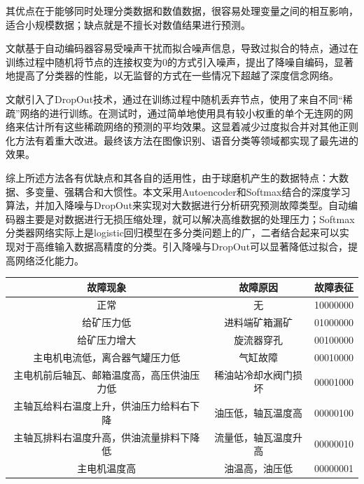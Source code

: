 \documentclass{ctacn}%
\begin{document}
\begin{multicols}{2}
其优点在于能够同时处理分类数据和数值数据，很容易处理变量之间的相互影响，适合小规模数据；缺点就是不擅长对数值结果进行预测。

文献\cite{vincent2010stacked}基于自动编码器容易受噪声干扰而拟合噪声信息，导致过拟合的特点，通过在训练过程中随机将节点的连接权变为0的方式引入噪声，提出了降噪自编码，显著地提高了分类器的性能，以无监督的方式在一些情况下超越了深度信念网络。

文献\cite{srivastava2014dropout, hinton2012improving}引入了DropOut技术，通过在训练过程中随机丢弃节点，使用了来自不同“稀疏”网络的进行训练。在测试时，通过简单地使用具有较小权重的单个无连网的网络来估计所有这些稀疏网络的预测的平均效果。这显着减少过度拟合并对其他正则化方法有着重大改进。最终该方法在图像识别、语音分类等领域都实现了最先进的效果。

综上所述方法各有优缺点和其各自的适用性，由于球磨机产生的数据特点：大数据、多变量、强耦合和大惯性。本文采用Autoencoder和Softmax结合的深度学习算法，并加入降噪与DropOut来实现对大数据进行分析研究预测故障类型。自动编码器主要是对数据进行无损压缩处理，就可以解决高维数据的处理压力；Softmax分类器网络实际上是logistic回归模型在多分类问题上的广，二者结合起来可以实现对于高维输入数据高精度的分类。引入降噪与DropOut可以显著降低过拟合，提高网络泛化能力。


\end{multicols}
\begin{center}
	\renewcommand\tabcolsep{12.6pt}%
	\label{tab1}
	\renewcommand\tabcolsep{10pt}
	\begin{tabular}{ccc}\toprule
	故障现象&故障原因&故障表征\\
	\hline
	正常&无&10000000\\
	给矿压力低&进料端矿箱漏矿&01000000\\
	给矿压力增大&旋流器穿孔&00100000\\
	主电机电流低，离合器气罐压力低&气缸故障&00010000\\
	主电机前后轴瓦、邮箱温度高，高压供油压力低&稀油站冷却水阀门损坏&00001000\\
	主轴瓦给料右温度上升，供油压力给料右下降&油压低，轴瓦温度高&00000100\\
	主轴瓦排料右温度升高，供油流量排料下降低&流量低，轴瓦温度升高&00000010\\
	主电机温度高&油温高，油压低&00000001\\
	\bottomrule
	\end{tabular}
\end{center}
\end{document}

